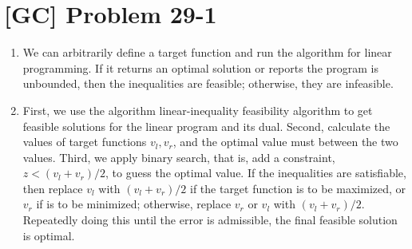 \documentclass[a4paper,11pt,twocolumn]{article}
\begin{document}
  \section{[GC] Problem 29-1}
  \begin{enumerate}
    \item We can arbitrarily define a target function and run the algorithm for linear programming. If it returns an optimal solution or reports the program is unbounded, then the inequalities are feasible; otherwise, they are infeasible.
    \item First, we use the algorithm linear-inequality feasibility algorithm to get feasible solutions for the linear program and its dual. Second, calculate the values of target functions $v_l, v_r$, and the optimal value must between the two values. Third, we apply binary search, that is, add a constraint, $z < (v_l+v_r)/2$, to guess the optimal value. If the inequalities are satisfiable, then replace $v_l$ with $(v_l+v_r)/2$ if the target function is to be maximized, or $v_r$ if is to be minimized; otherwise, replace $v_r$ or $v_l$ with $(v_l+v_r)/2$. Repeatedly doing this until the error is admissible, the final feasible solution is optimal.
  \end{enumerate}
\end{document}
